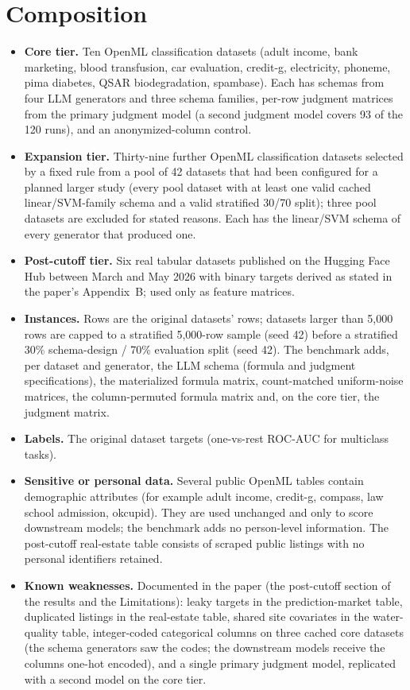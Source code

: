 \documentclass[11pt]{article}
\begin{document}
\section*{Composition}
\begin{itemize}
\item \textbf{Core tier.} Ten OpenML classification datasets (adult income, bank marketing, blood transfusion, car evaluation, credit-g, electricity, phoneme, pima diabetes, QSAR biodegradation, spambase). Each has schemas from four LLM generators and three schema families, per-row judgment matrices from the primary judgment model (a second judgment model covers 93 of the 120 runs), and an anonymized-column control.
\item \textbf{Expansion tier.} Thirty-nine further OpenML classification datasets selected by a fixed rule from a pool of 42 datasets that had been configured for a planned larger study (every pool dataset with at least one valid cached linear/SVM-family schema and a valid stratified 30/70 split); three pool datasets are excluded for stated reasons. Each has the linear/SVM schema of every generator that produced one.
\item \textbf{Post-cutoff tier.} Six real tabular datasets published on the Hugging Face Hub between March and May 2026 with binary targets derived as stated in the paper's Appendix~B; used only as feature matrices.
\item \textbf{Instances.} Rows are the original datasets' rows; datasets larger than 5,000 rows are capped to a stratified 5,000-row sample (seed 42) before a stratified 30\% schema-design / 70\% evaluation split (seed 42). The benchmark adds, per dataset and generator, the LLM schema (formula and judgment specifications), the materialized formula matrix, count-matched uniform-noise matrices, the column-permuted formula matrix and, on the core tier, the judgment matrix.
\item \textbf{Labels.} The original dataset targets (one-vs-rest ROC-AUC for multiclass tasks).
\item \textbf{Sensitive or personal data.} Several public OpenML tables contain demographic attributes (for example adult income, credit-g, compass, law school admission, okcupid). They are used unchanged and only to score downstream models; the benchmark adds no person-level information. The post-cutoff real-estate table consists of scraped public listings with no personal identifiers retained.
\item \textbf{Known weaknesses.} Documented in the paper (the post-cutoff section of the results and the Limitations): leaky targets in the prediction-market table, duplicated listings in the real-estate table, shared site covariates in the water-quality table, integer-coded categorical columns on three cached core datasets (the schema generators saw the codes; the downstream models receive the columns one-hot encoded), and a single primary judgment model, replicated with a second model on the core tier.
\end{itemize}
\end{document}
